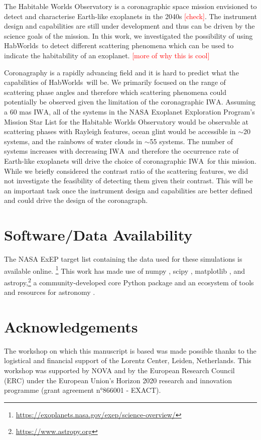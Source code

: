 \documentclass[
    usenatbib,
]{mnras}
\newcommand{\todo}[1]{\textcolor{red}{[#1]}}
\newcommand{\IWA}{\ensuremath{\mathrm{IWA}}}
\newcommand{\hwo}{HabWorlds}
\begin{document}
The Habitable Worlds Observatory is a coronagraphic space mission envisioned to detect and characterise Earth-like exoplanets in the 2040s \todo{check}. 
%
The instrument design and capabilities are still under development and thus can be driven by the science goals of the mission.
%
In this work, we investigated the possibility of using \hwo\ to detect different scattering phenomena which can be used to indicate the habitability of an exoplanet. \todo{more of why this is cool}

Coronagraphy is a rapidly advancing field and it is hard to predict what the capabilities of \hwo\ will be.
%
We primarily focused on the range of scattering phase angles and therefore which scattering phenomena could potentially be observed given the limitation of the coronagraphic \IWA.
%
Assuming a 60 mas \IWA, all of the systems in the NASA Exoplanet Exploration Program's Mission Star List for the Habitable Worlds Observatory would be observable at scattering phases with Rayleigh features, ocean glint would be accessible in $\sim$20 systems, and the rainbows of water clouds in $\sim$55 systems. 
%
The number of systems increases with decreasing \IWA\ and therefore the occurrence rate of Earth-like exoplanets will drive the choice of coronagraphic \IWA\ for this mission.
%
While we briefly considered the contrast ratio of the scattering features, we did not investigate the feasibility of detecting them given their contrast. 
%
This will be an important task once the instrument design and capabilities are better defined and could drive the design of the coronagraph. 


\section*{Software/Data Availability}

The NASA ExEP target list containing the data used for these simulations is available online.%
\footnote{\url{https://exoplanets.nasa.gov/exep/science-overview/}}
This work has made use of \textsf{numpy}
 \citep{NumPy2020}, \textsf{scipy} \citep{scipy_2020}, \textsf{matplotlib} \citep{matplotlib2007}, and \textsf{astropy},\footnote{\url{https://www.astropy.org}} a community-developed core Python package and an ecosystem of tools and resources for astronomy \citep{astropy:2013, astropy:2018, astropy:2022}.




\section*{Acknowledgements}
The workshop on which this manuscript is based was made possible thanks to the logistical and financial support of the Lorentz Center, Leiden, Netherlands. This workshop was supported by NOVA  and by the European Research Council (ERC) under the European Union's Horizon 2020 research and innovation programme (grant agreement n°866001 - EXACT).
\end{document}
